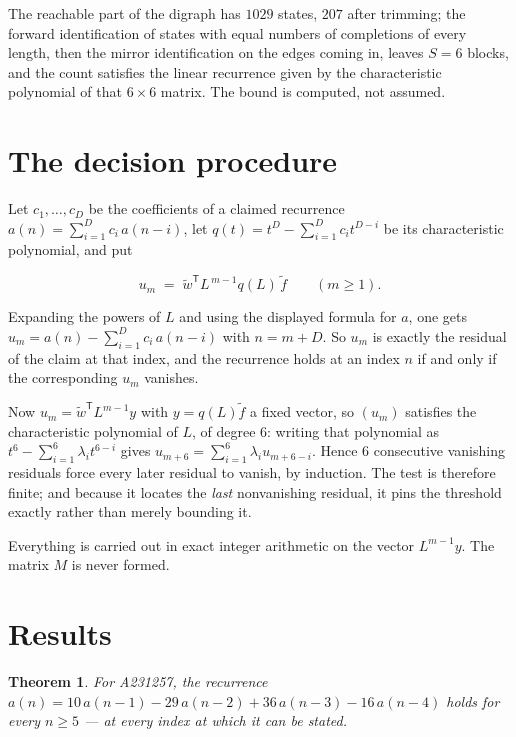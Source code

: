 \documentclass[11pt]{article}
\newtheorem{theorem}{Theorem}
\theoremstyle{definition}
\begin{document}
The reachable part of the digraph has $1029$ states, $207$ after trimming; the forward identification of states with equal numbers of completions of every length, then the mirror identification on the edges coming in, leaves $S = 6$ blocks, and the count satisfies the linear recurrence given by the characteristic polynomial of that $6\times6$ matrix. The bound is computed, not assumed.

\section{The decision procedure}

Let $c_1,\dots,c_D$ be the coefficients of a claimed recurrence $a(n) = \sum_{i=1}^{D} c_i\,a(n-i)$, let $q(t) = t^{D} - \sum_{i=1}^{D} c_i t^{D-i}$ be its characteristic polynomial, and put

\[u_m \;=\; \tilde w^{\mathsf T} L^{\,m-1} q(L)\,\tilde f \qquad (m \ge 1).\]

Expanding the powers of $L$ and using the displayed formula for $a$, one gets $u_m = a(n) - \sum_{i=1}^{D} c_i\,a(n-i)$ with $n = m + D$. So $u_m$ is exactly the residual of the claim at that index, and the recurrence holds at an index $n$ if and only if the corresponding $u_m$ vanishes.

Now $u_m = \tilde w^{\mathsf T} L^{m-1} y$ with $y = q(L)\tilde f$ a fixed vector, so $(u_m)$ satisfies the characteristic polynomial of $L$, of degree $6$: writing that polynomial as $t^{6} - \sum_{i=1}^{6} \lambda_i t^{6-i}$ gives $u_{m+6} = \sum_{i=1}^{6} \lambda_i u_{m+6-i}$. Hence $6$ consecutive vanishing residuals force every later residual to vanish, by induction. The test is therefore finite; and because it locates the {\itshape last} nonvanishing residual, it pins the threshold exactly rather than merely bounding it.

Everything is carried out in exact integer arithmetic on the vector $L^{m-1}y$. The matrix $M$ is never formed.

\section{Results}

\begin{theorem} For A231257, the recurrence $a(n) = 10\,a(n-1) - 29\,a(n-2) + 36\,a(n-3) - 16\,a(n-4)$ holds for every $n \ge 5$ --- at every index at which it can be stated.\end{theorem}
\end{document}
